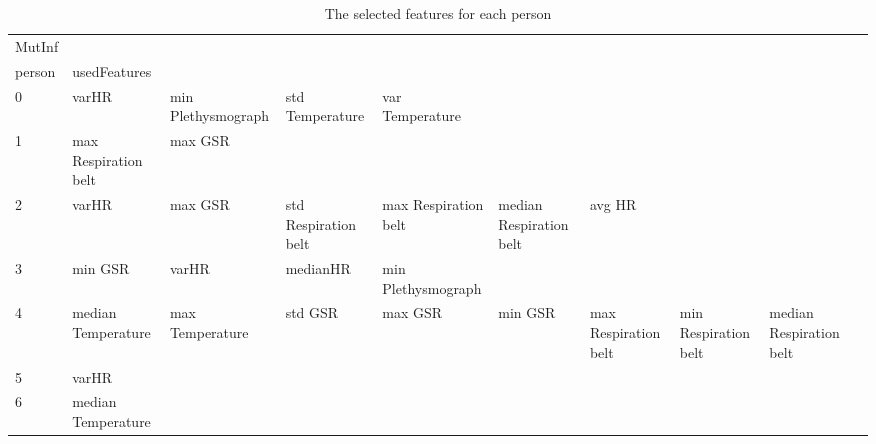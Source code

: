 \begin{landscape}
\begin{table}[]
\centering
\caption{The selected features for each person}
\begin{tabular}{l|llllllll}
MutInf   &                         &                         &                         &                         &                         &                       &                         &                         &                         &         \\
person   & usedFeatures            &                         &                         &                         &                         &                       &                         &                         &                         &         \\
0        & varHR                   & min Plethysmograph      & std Temperature         & var Temperature         &                         &                       &                         &                         &                         &         \\
1        & max Respiration belt    & max GSR                 &                         &                         &                         &                       &                         &                         &                         &         \\
2        & varHR                   & max GSR                 & std Respiration belt    & max Respiration belt    & median Respiration belt & avg HR                &                         &                         &                         &         \\
3        & min GSR                 & varHR                   & medianHR                & min Plethysmograph      &                         &                       &                         &                         &                         &         \\
4        & median Temperature      & max Temperature         & std GSR                 & max GSR                 & min GSR                 & max Respiration belt  & min Respiration belt    & median Respiration belt &                         &         \\
5        & varHR                   &                         &                         &                         &                         &                       &                         &                         &                         &         \\
6        & median Temperature      &                         &                         &                         &                         &                       &                         &                         &                         &         \\

\end{tabular}
\end{table}
\end{landscape}
